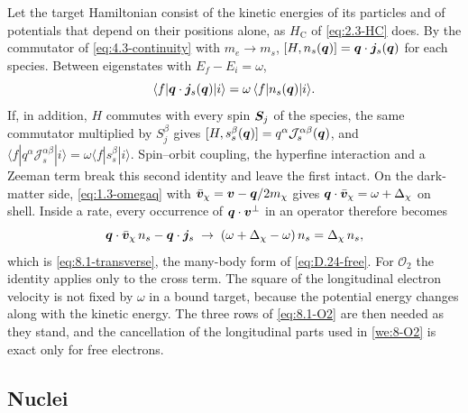 Let the target Hamiltonian consist of the kinetic energies of its particles and of potentials that depend on their positions alone, as $H_{\mathrm{C}}$ of \cref{eq:2.3-HC} does. By the commutator of \cref{eq:4.3-continuity} with $m_e \to m_s$, $[H, n_s(\bm{q})] = \bm{q}\cdot\bm{j}_s(\bm{q})$ for each species. Between eigenstates with $E_f - E_i = \omega$,
\begin{equation}
  \langle f|\bm{q}\cdot\bm{j}_s(\bm{q})|i\rangle = \omega\,\langle f|n_s(\bm{q})|i\rangle .
  \label{eq:D.24-cont}
\end{equation}
If, in addition, $H$ commutes with every spin $\bm{S}_j$ of the species, the same commutator multiplied by $S^\beta_j$ gives $[H, s^\beta_s(\bm{q})] = q^\alpha\mathcal{J}^{\alpha\beta}_s(\bm{q})$, and $\langle f|q^\alpha\mathcal{J}^{\alpha\beta}_s|i\rangle = \omega\langle f|s^\beta_s|i\rangle$. Spin--orbit coupling, the hyperfine interaction and a Zeeman term break this second identity and leave the first intact. On the dark-matter side, \cref{eq:1.3-omegaq} with $\bar{\bm{v}}_\chi = \bm{v} - \bm{q}/2m_{\chi}$ gives $\bm{q}\cdot\bar{\bm{v}}_\chi = \omega + \Delta_\chi$ on shell. Inside a rate, every occurrence of $\bm{q}\cdot\bm{v}^\perp$ in an operator therefore becomes
\begin{equation}
  \bm{q}\cdot\bar{\bm{v}}_\chi\,n_s - \bm{q}\cdot\bm{j}_s \;\to\; (\omega + \Delta_\chi - \omega)\,n_s = \Delta_\chi\,n_s ,
  \label{eq:D.24-long}
\end{equation}
which is \cref{eq:8.1-transverse}, the many-body form of \cref{eq:D.24-free}. For $\mathcal{O}_2$ the identity applies only to the cross term. The square of the longitudinal electron velocity is not fixed by $\omega$ in a bound target, because the potential energy changes along with the kinetic energy. The three rows of \cref{eq:8.1-O2} are then needed as they stand, and the cancellation of the longitudinal parts used in \cref{we:8-O2} is exact only for free electrons.

\subsection{Nuclei}

